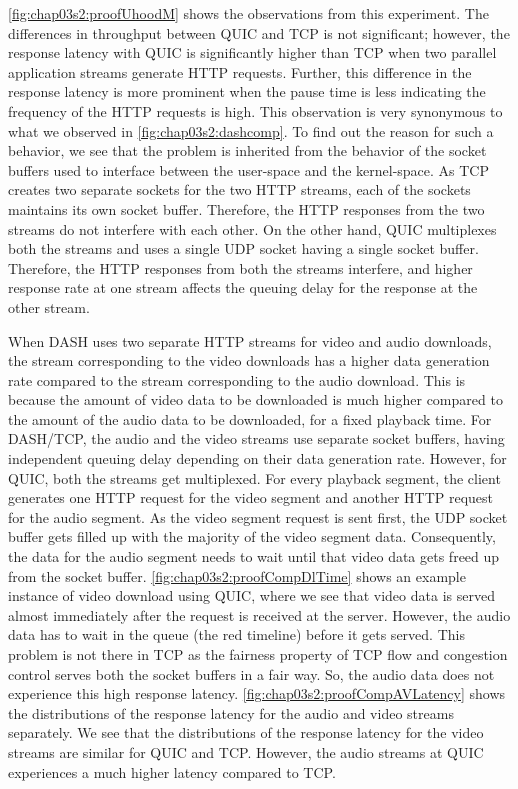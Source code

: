 \fig\ref{fig:chap03s2:proofUhoodM} shows the observations from this experiment. The differences in throughput between \ac{QUIC} and \ac{TCP} is not significant; however, the response latency with \ac{QUIC} is significantly higher than \ac{TCP} when two parallel application streams generate \ac{HTTP} requests. Further, this difference in the response latency is more prominent when the pause time is less indicating the frequency of the \ac{HTTP} requests is high. This observation is very synonymous to what we observed in \fig\ref{fig:chap03s2:dashcomp}. To find out the reason for such a behavior, we see that the problem is inherited from the behavior of the socket buffers used to interface between the user-space and the kernel-space. As \ac{TCP} creates two separate sockets for the two \ac{HTTP} streams, each of the sockets maintains its own socket buffer. Therefore, the \ac{HTTP} responses from the two streams do not interfere with each other. On the other hand, \ac{QUIC} multiplexes both the streams and uses a single \ac{UDP} socket having a single socket buffer. Therefore, the \ac{HTTP} responses from both the streams interfere, and higher response rate at one stream affects the queuing delay for the response at the other stream.


When \ac{DASH} uses two separate \ac{HTTP} streams for video and audio downloads, the stream corresponding to the video downloads has a higher data generation rate compared to the stream corresponding to the audio download. This is because the amount of video data to be downloaded is much higher compared to the amount of the audio data to be downloaded, for a fixed playback time. For DASH/TCP, the audio and the video streams use separate socket buffers, having independent queuing delay depending on their data generation rate. However, for \ac{QUIC}, both the streams get multiplexed. For every playback segment, the client generates one \ac{HTTP} request for the video segment and another \ac{HTTP} request for the audio segment. As the video segment request is sent first, the \ac{UDP} socket buffer gets filled up with the majority of the video segment data. Consequently, the data for the audio segment needs to wait until that video data gets freed up from the socket buffer. \fig\ref{fig:chap03s2:proofCompDlTime} shows an example instance of video download using \ac{QUIC}, where we see that video data is served almost immediately after the request is received at the server. However, the audio data has to wait in the queue (the red timeline) before it gets served. This problem is not there in \ac{TCP} as the fairness property of \ac{TCP} flow and congestion control serves both the socket buffers in a fair way. So, the audio data does not experience this high response latency. \fig\ref{fig:chap03s2:proofCompAVLatency} shows the distributions of the response latency for the audio and video streams separately. We see that the distributions of the response latency for the video streams are similar for \ac{QUIC} and \ac{TCP}. However, the audio streams at \ac{QUIC} experiences a much higher latency compared to \ac{TCP}.


